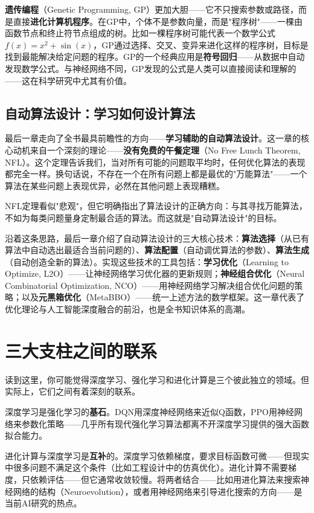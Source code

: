 \documentclass[lang=cn,zihao=-4,a4paper,fontset=windows]{beautybook}
\begin{document}
{\textbf{遗传编程}（Genetic Programming, GP）更加大胆——它不只搜索参数或路径，而是直接\textbf{进化计算机程序}。在GP中，个体不是参数向量，而是"程序树"——一棵由函数节点和终止符节点组成的树。比如一棵程序树可能代表一个数学公式$f(x) = x^2 + \sin(x)$，GP通过选择、交叉、变异来进化这样的程序树，目标是找到最能解决给定问题的程序。GP的一个经典应用是\textbf{符号回归}——从数据中自动发现数学公式。与神经网络不同，GP发现的公式是人类可以直接阅读和理解的——这在科学研究中尤其有价值。

\subsection*{自动算法设计：学习如何设计算法}

最后一章走向了全书最具前瞻性的方向——\textbf{学习辅助的自动算法设计}。这一章的核心动机来自一个深刻的理论——\textbf{没有免费的午餐定理}（No Free Lunch Theorem, NFL）。这个定理告诉我们，当对所有可能的问题取平均时，任何优化算法的表现都完全一样。换句话说，不存在一个在所有问题上都是最优的"万能算法"——一个算法在某些问题上表现优异，必然在其他问题上表现糟糕。

NFL定理看似"悲观"，但它明确指出了算法设计的正确方向：与其寻找万能算法，不如为每类问题量身定制最合适的算法。而这就是"自动算法设计"的目标。

沿着这条思路，最后一章介绍了自动算法设计的三大核心技术：\textbf{算法选择}（从已有算法中自动选出最适合当前问题的）、\textbf{算法配置}（自动调优算法的参数）、\textbf{算法生成}（自动创造全新的算法）。实现这些技术的工具包括：\textbf{学习优化}（Learning to Optimize, L2O）——让神经网络学习优化器的更新规则；\textbf{神经组合优化}（Neural Combinatorial Optimization, NCO）——用神经网络学习解决组合优化问题的策略；以及\textbf{元黑箱优化}（MetaBBO）——统一上述方法的数学框架。这一章代表了优化理论与人工智能深度融合的前沿，也是全书知识体系的高潮。

\section*{三大支柱之间的联系}

读到这里，你可能觉得深度学习、强化学习和进化计算是三个彼此独立的领域。但实际上，它们之间有着深刻的联系。

深度学习是强化学习的\textbf{基石}。DQN用深度神经网络来近似Q函数，PPO用神经网络来参数化策略——几乎所有现代强化学习算法都离不开深度学习提供的强大函数拟合能力。

进化计算与深度学习是\textbf{互补}的。深度学习依赖梯度，要求目标函数可微——但现实中很多问题不满足这个条件（比如工程设计中的仿真优化）。进化计算不需要梯度，只依赖评估——但它通常收敛较慢。将两者结合——比如用进化算法来搜索神经网络的结构（Neuroevolution），或者用神经网络来引导进化搜索的方向——是当前AI研究的热点。

}
\end{document}
